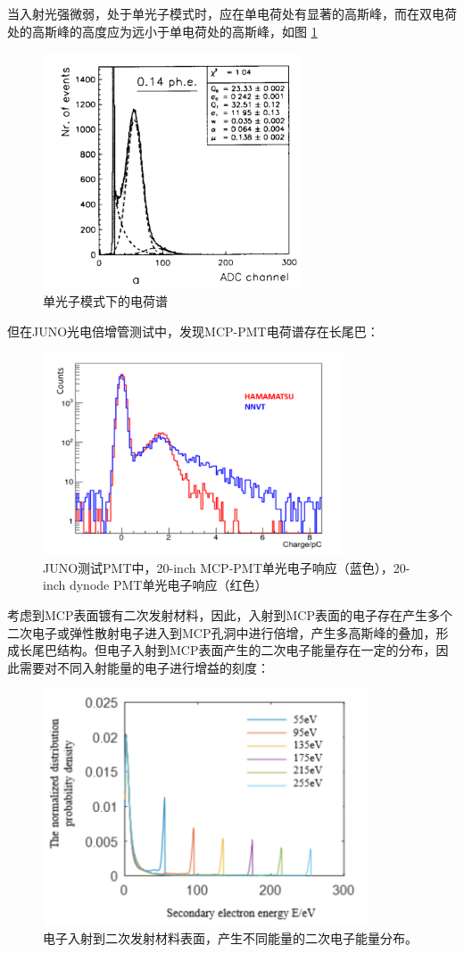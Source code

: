 \documentclass[a4paper]{article}
\begin{document}
当入射光强微弱，处于单光子模式时，应在单电荷处有显著的高斯峰，而在双电荷处的高斯峰的高度应为远小于单电荷处的高斯峰\cite{1994Absolute}，如图  \ref{fig:spe_sreal}
\begin{figure}[ht]
    \centering
    \includegraphics[height=7cm]{images/spe_sreal.png}
    \caption{单光子模式下的电荷谱}
    \label{fig:spe_sreal}
\end{figure}

但在JUNO光电倍增管测试中，发现MCP-PMT电荷谱存在长尾巴\cite{2021Gain}：
\begin{figure}[ht]
    \centering
    \includegraphics[height=6cm]{images/JUNO_spe.png}
    \caption{JUNO测试PMT中，20-inch MCP-PMT单光电子响应（蓝色），20-inch dynode PMT单光电子响应（红色）}
    \label{fig:spe_JUNO}
\end{figure}

考虑到MCP表面镀有二次发射材料，因此，入射到MCP表面的电子存在产生多个二次电子或弹性散射电子进入到MCP孔洞中进行倍增，产生多高斯峰的叠加，形成长尾巴结构。但电子入射到MCP表面产生的二次电子能量存在一定的分布，因此需要对不同入射能量的电子进行增益的刻度\cite{2020Analysis}：
\begin{figure}[ht]
    \centering
    \includegraphics[height=7cm]{images/sey.png}
    \caption{电子入射到二次发射材料表面，产生不同能量的二次电子能量分布。}
    \label{fig:sey}
\end{figure}
\end{document}
